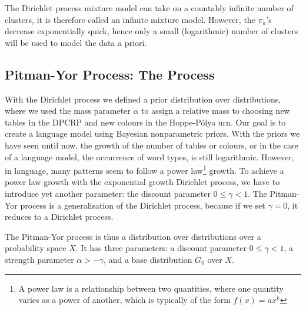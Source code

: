 The Dirichlet process mixture model can take on a countably infinite number of clusters, it is therefore called an infinite mixture model. However, the $\pi_k$'s decrease exponentially quick, hence only a small (logarithmic) number of clusters will be used to model the data a priori.



\subsection{Pitman-Yor Process: The Process}
With the Dirichlet process we defined a prior distribution over distributions, where we used the mass parameter $\alpha$ to assign a relative mass to choosing new tables in the DPCRP and new colours in the Hoppe-P\'olya urn. Our goal is to create a language model using Bayesian nonparametric priors. With the priors we have seen until now, the growth of the number of tables or colours, or in the case of a language model, the occurrence of word types, is still logarithmic. However, in language, many patterns seem to follow a power law\footnote{A power law is a relationship between two quantities, where one quantity varies as a power of another, which is typically of the form $f(x)=ax^k$} growth.\cite{Goldwater2006Interpolating} 
To achieve a power law growth with the exponential growth Dirichlet process, we have to introduce yet another parameter: the discount parameter $0 \leq \gamma < 1$. The Pitman-Yor process is a generalisation of the Dirichlet process, because if we set $\gamma = 0$, it reduces to a Dirichlet process.

The Pitman-Yor process is thus a distribution over distributions over a probability space $X$. It has three parameters: a discount parameter $0\leq\gamma<1$, a strength parameter $\alpha > -\gamma$, and a base distribution $G_0$ over $X$. 

